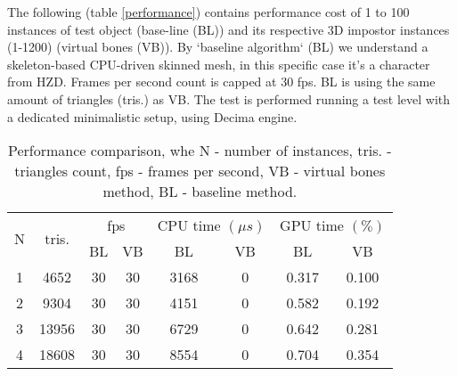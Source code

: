 \documentclass{acmsiggraph}
\begin{document}
The following (table \ref{performance}) contains performance cost of 1 to 100 instances of test object (base-line (BL)) and its respective 3D impostor instances (1-1200) (virtual bones (VB)). By `baseline algorithm` (BL) we understand a skeleton-based CPU-driven skinned mesh, in this specific case it's a character from HZD. Frames per second count is capped at 30 fps. BL is using the same amount of triangles (tris.) as VB.  The test is performed running a test level with a dedicated minimalistic setup, using Decima engine.

\begin{table}[h]
  \centering
  \caption{Performance comparison, whe N - number of instances, tris. - triangles count, fps - frames per second, VB - virtual bones method, BL - baseline method.}
  \begin{tabular}{|c|c|c|c|c|c|c|c|}
    \hline
    \multirow{2}{*}{N} & \multirow{2}{*}{tris.} & \multicolumn{2}{|c|}{fps}& \multicolumn{2}{|c|}{CPU time \( (\mu s) \)} & \multicolumn{2}{|c|}{GPU time \( (\%) \) }  \\ \cline{3-8}
                       &                        & BL & VB                  & BL    & VB                                    & BL    & VB                                 \\       
    \hline                                                                                                                                                   
                    1  & 4652                   & 30 & 30                  & 3168  & 0                                     & 0.317 & 0.100                              \\   
    \hline                                                                                                                                                      
                    2  & 9304                   & 30 & 30                  & 4151  & 0                                     & 0.582 & 0.192                              \\   
    \hline                                                                             
                    3  & 13956                  & 30 & 30                  & 6729  & 0                                     & 0.642 & 0.281                              \\   
    \hline                                                                             
                    4  & 18608                  & 30 & 30                  & 8554  & 0                                     & 0.704 & 0.354                              \\   

\end{tabular}
\end{table}
\end{document}
